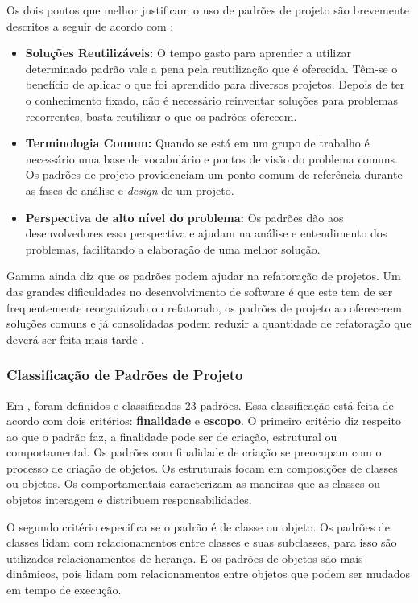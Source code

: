 Os dois pontos que melhor justificam o uso de padrões de projeto são brevemente descritos a seguir de acordo com \cite{Shalloway:Trott:2004}:

\begin{itemize}
	\item \textbf{Soluções Reutilizáveis:} O tempo gasto para aprender a utilizar determinado padrão vale a pena pela reutilização que é oferecida. Têm-se o benefício de aplicar o que foi aprendido para diversos projetos. Depois de ter o conhecimento fixado, não é necessário reinventar soluções para problemas recorrentes, basta reutilizar o que os padrões oferecem.
	\item \textbf{Terminologia Comum:} Quando se está em um grupo de trabalho é necessário uma base de vocabulário e pontos de visão do problema comuns. Os padrões de projeto providenciam um ponto comum de referência durante as fases de análise e \textit{design} de um projeto.
	\item \textbf{Perspectiva de alto nível do problema:} Os padrões dão aos desenvolvedores essa perspectiva e ajudam na análise e entendimento dos problemas, facilitando a elaboração de uma melhor solução.
\end{itemize}

Gamma ainda diz que os padrões podem ajudar na refatoração de projetos. Um das grandes dificuldades no desenvolvimento de software é que este tem de ser frequentemente reorganizado ou refatorado, os padrões de projeto ao oferecerem soluções comuns e já consolidadas podem reduzir a quantidade de refatoração que deverá ser feita mais tarde \cite{Gamma:Helm:Johnson:Vlissides:1995}.

\subsubsection{Classificação de Padrões de Projeto}

Em \cite{Gamma:Helm:Johnson:Vlissides:1995}, foram definidos e classificados 23 padrões. Essa classificação está feita de acordo com dois critérios: \textbf{finalidade} e \textbf{escopo}. O primeiro critério diz respeito ao que o padrão faz, a finalidade pode ser de criação, estrutural ou comportamental. Os padrões com finalidade de criação se preocupam com o processo de criação de objetos. Os estruturais focam em composições de classes ou objetos. Os comportamentais caracterizam as maneiras que as classes ou objetos interagem e distribuem responsabilidades.

O segundo critério especifica se o padrão é de classe ou objeto. Os padrões de classes lidam com relacionamentos entre classes e suas subclasses, para isso são utilizados relacionamentos de herança. E os padrões de objetos são mais dinâmicos, pois lidam com relacionamentos entre objetos que podem ser mudados em tempo de execução.

